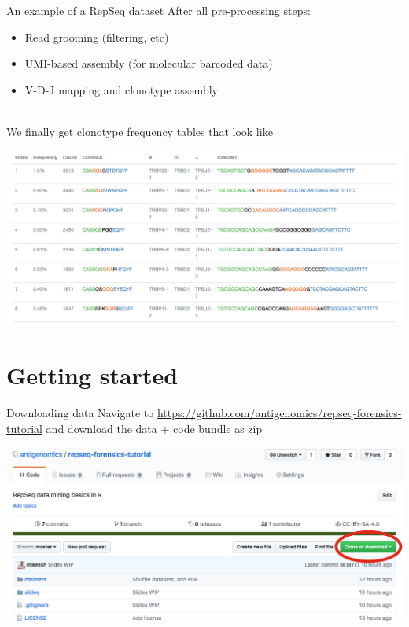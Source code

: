 \documentclass[12pt]{beamer}
\begin{document}
\begin{frame}{An example of a RepSeq dataset}
After all pre-processing steps:
\begin{itemize}
\item Read grooming (filtering, etc)
\item UMI-based assembly (for molecular barcoded data)
\item V-D-J mapping and clonotype assembly\\~\
\end{itemize}

\pause
We finally get clonotype frequency tables that look like
\begin{center}
\includegraphics[width=\textwidth]{p6}
\end{center}
\end{frame}

\section{Getting started}

\begin{frame}{Downloading data}
Navigate to \url{https://github.com/antigenomics/repseq-forensics-tutorial} and download the data + code bundle as zip
\begin{center}
\includegraphics[width=\textwidth]{p7}
\end{center}
\end{frame}
\end{document}
